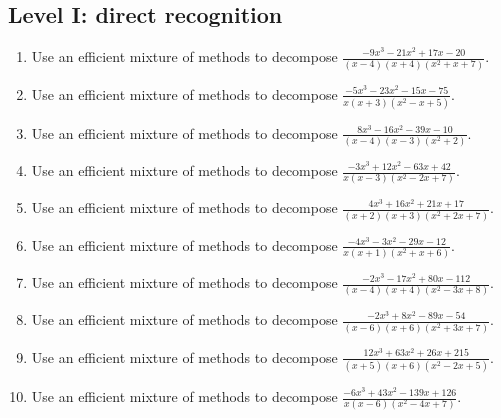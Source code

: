 \documentclass[11pt,oneside]{book}
\begin{document}
\subsection*{Level I: direct recognition}
\begin{enumerate}[leftmargin=*,label=\textbf{\arabic*.},itemsep=0.65\baselineskip]
\item Use an efficient mixture of methods to decompose $\displaystyle \frac{- 9 x^{3} - 21 x^{2} + 17 x - 20}{\left(x - 4\right) \left(x + 4\right) \left(x^{2} + x + 7\right)}$.
\item Use an efficient mixture of methods to decompose $\displaystyle \frac{- 5 x^{3} - 23 x^{2} - 15 x - 75}{x \left(x + 3\right) \left(x^{2} - x + 5\right)}$.
\item Use an efficient mixture of methods to decompose $\displaystyle \frac{8 x^{3} - 16 x^{2} - 39 x - 10}{\left(x - 4\right) \left(x - 3\right) \left(x^{2} + 2\right)}$.
\item Use an efficient mixture of methods to decompose $\displaystyle \frac{- 3 x^{3} + 12 x^{2} - 63 x + 42}{x \left(x - 3\right) \left(x^{2} - 2 x + 7\right)}$.
\item Use an efficient mixture of methods to decompose $\displaystyle \frac{4 x^{3} + 16 x^{2} + 21 x + 17}{\left(x + 2\right) \left(x + 3\right) \left(x^{2} + 2 x + 7\right)}$.
\item Use an efficient mixture of methods to decompose $\displaystyle \frac{- 4 x^{3} - 3 x^{2} - 29 x - 12}{x \left(x + 1\right) \left(x^{2} + x + 6\right)}$.
\item Use an efficient mixture of methods to decompose $\displaystyle \frac{- 2 x^{3} - 17 x^{2} + 80 x - 112}{\left(x - 4\right) \left(x + 4\right) \left(x^{2} - 3 x + 8\right)}$.
\item Use an efficient mixture of methods to decompose $\displaystyle \frac{- 2 x^{3} + 8 x^{2} - 89 x - 54}{\left(x - 6\right) \left(x + 6\right) \left(x^{2} + 3 x + 7\right)}$.
\item Use an efficient mixture of methods to decompose $\displaystyle \frac{12 x^{3} + 63 x^{2} + 26 x + 215}{\left(x + 5\right) \left(x + 6\right) \left(x^{2} - 2 x + 5\right)}$.
\item Use an efficient mixture of methods to decompose $\displaystyle \frac{- 6 x^{3} + 43 x^{2} - 139 x + 126}{x \left(x - 6\right) \left(x^{2} - 4 x + 7\right)}$.
\end{enumerate}
\end{document}
